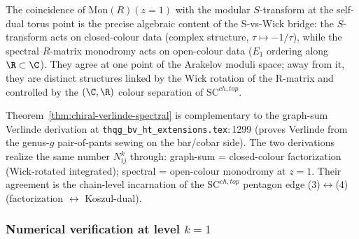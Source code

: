 \begin{remark}
\label{rem:chiral-verlinde-v2ap24}
The coincidence of $\mathrm{Mon}(R)(z=1)$ with the modular
$S$-transform at the self-dual torus point is the precise
algebraic content of the S-vs-Wick bridge: the $S$-transform acts on
closed-colour data (complex structure, $\tau \mapsto -1/\tau$),
while the spectral $R$-matrix monodromy acts on open-colour
data ($E_1$ ordering along $\R \subset \C$). They agree at one
point of the Arakelov moduli space; away from it, they are
distinct structures linked by the Wick rotation of the R-matrix and
controlled by the $(\C, \R)$ colour separation of
$\mathrm{SC}^{ch,top}$.
\end{remark}

\begin{remark}
\label{rem:chiral-verlinde-vs-graph-sum}
Theorem~\ref{thm:chiral-verlinde-spectral} is complementary to
the graph-sum Verlinde derivation at
\texttt{thqg\_bv\_ht\_extensions.tex}:\,1299 (proves
Verlinde from the genus-$g$ pair-of-pants sewing on the
bar/cobar side). The two derivations realize the same number
$N^k_{ij}$ through: graph-sum = closed-colour factorization
(Wick-rotated integrated); spectral = open-colour monodromy at
$z=1$. Their agreement is the chain-level incarnation of the
$\mathrm{SC}^{ch,top}$ pentagon edge (3)$\leftrightarrow$(4)
(factorization $\leftrightarrow$ Koszul-dual).
\end{remark}


\subsubsection{Numerical verification at level $k = 1$}
\label{subsubsec:benchmark-k-equals-1}

